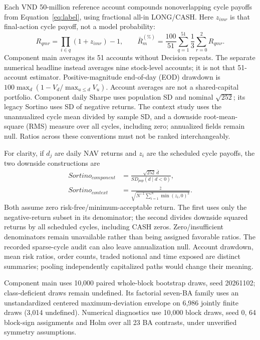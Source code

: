 Each VND 50-million reference account compounds nonoverlapping cycle
payoffs from Equation~\ref{eq:label}, using fractional all-in LONG/CASH.
Here $z_{imr}$ is that final-action cycle payoff, not a model probability:
\begin{equation}
R_{qmr}=\prod_{i\in q}(1+z_{imr})-1,\qquad
\bar R_m^{(\%)}=\frac{100}{51}\sum_{q=1}^{51}\frac13\sum_{r=0}^2R_{qmr}.
\end{equation}
Component main averages its 51 accounts without Decision repeats. The
separate numerical headline instead averages nine stock-level accounts;
it is not that 51-account estimator. Positive-magnitude end-of-day (EOD) drawdown is
$100\max_d(1-V_d/\max_{u\le d}V_u)$. Account averages are not a shared-capital
portfolio. Component daily Sharpe uses population SD and nominal
$\sqrt{252}$; its legacy Sortino uses SD of negative returns. The context study uses the unannualized cycle mean divided by sample SD,
and a downside root-mean-square (RMS) measure over all cycles,
including zero; annualized fields remain null. Ratios across these
conventions must not be ranked interchangeably.

For clarity, if $d_j$ are daily NAV returns and $z_i$ are the scheduled
cycle payoffs, the two downside constructions are
\begin{align}
Sortino_{component}&=\frac{\sqrt{252}\,\bar d}
 {SD_{pop}(d\mid d<0)},\\
Sortino_{context}&=\frac{\bar z}
 {\sqrt{N^{-1}\sum_{i=1}^{N}\min(z_i,0)^2}}.
\end{align}
Both assume zero risk-free/minimum-acceptable return. The first uses
only the negative-return subset in its denominator; the second divides
downside squared returns by all scheduled cycles, including CASH zeros.
Zero/insufficient denominators remain unavailable rather than being
assigned favorable ratios. The recorded sparse-cycle audit can also
leave annualization null. Account drawdown, mean risk ratios, order
counts, traded notional and time exposed are distinct summaries; pooling
independently capitalized paths would change their meaning.

Component main uses 10,000 paired whole-block bootstrap draws, seed
20261102; class-deficient draws remain undefined. Its factorial seven-BA
family uses an unstandardized centered maximum-deviation envelope on
6,986 jointly finite draws (3,014 undefined). Numerical diagnostics use
10,000 block draws, seed 0, 64 block-sign assignments and Holm over all
23 BA contrasts, under unverified symmetry assumptions.

